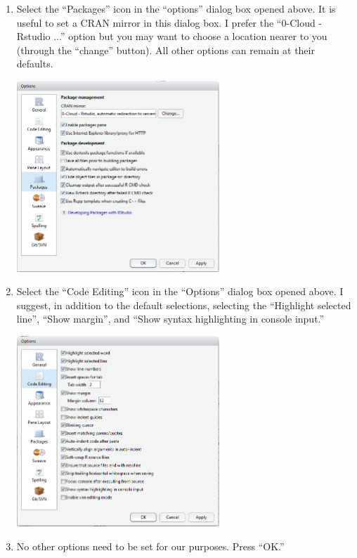 \documentclass{article}\usepackage[]{graphicx}\usepackage[]{color}
\begin{document}
\begin{enumerate}
  \item Select the ``Packages'' icon in the ``options'' dialog box opened above.  It is useful to set a CRAN mirror in this dialog box.  I prefer the ``0-Cloud - Rstudio ...'' option but you may want to choose a location nearer to you (through the ``change'' button).  All other options can remain at their defaults.
\begin{center}
  \includegraphics[width=3in]{Figs/RStudio_Prep_OptionsCRAN.png}
\end{center}

  \newpage
\item Select the ``Code Editing'' icon in the ``Options'' dialog box opened above.  I suggest, in addition to the default selections, selecting the ``Highlight selected line'', ``Show margin'', and ``Show syntax highlighting in console input.''
\begin{center}
  \includegraphics[width=3in]{Figs/RStudio_Prep_OptionsCodeEditing.png}
\end{center}

  \item No other options need to be set for our purposes.  Press ``OK.''
\end{enumerate}
\end{document}
